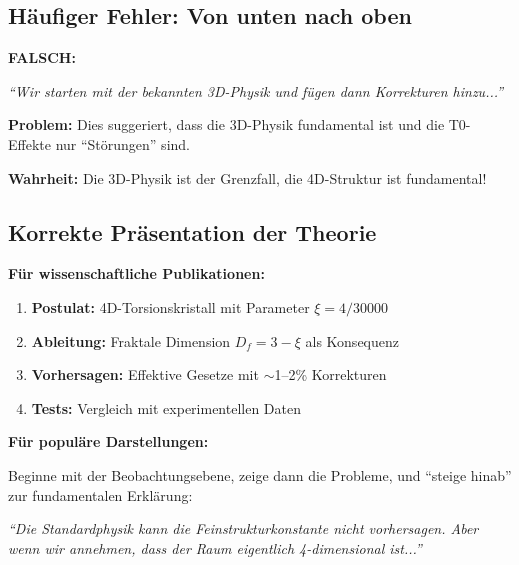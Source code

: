 	\subsection{Häufiger Fehler: Von unten nach oben}
	
	\begin{warning}
		\textbf{FALSCH:}
		
		\textit{\enquote{Wir starten mit der bekannten 3D-Physik und fügen dann Korrekturen hinzu...}}
		
		\vspace{0.3cm}
		
		\textbf{Problem:} Dies suggeriert, dass die 3D-Physik fundamental ist und die T0-Effekte nur \enquote{Störungen} sind.
		
		\vspace{0.3cm}
		
		\textbf{Wahrheit:} Die 3D-Physik ist der Grenzfall, die 4D-Struktur ist fundamental!
	\end{warning}
	
	\subsection{Korrekte Präsentation der Theorie}
	
	\begin{important}
		\textbf{Für wissenschaftliche Publikationen:}
		
		\begin{enumerate}
			\item \textbf{Postulat:} 4D-Torsionskristall mit Parameter $\xi = 4/30000$
			\item \textbf{Ableitung:} Fraktale Dimension $D_f = 3-\xi$ als Konsequenz
			\item \textbf{Vorhersagen:} Effektive Gesetze mit $\sim$1--2\% Korrekturen
			\item \textbf{Tests:} Vergleich mit experimentellen Daten
		\end{enumerate}
		
		\vspace{0.3cm}
		
		\textbf{Für populäre Darstellungen:}
		
		Beginne mit der Beobachtungsebene, zeige dann die Probleme, und \enquote{steige hinab} zur fundamentalen Erklärung:
		
		\textit{\enquote{Die Standardphysik kann die Feinstrukturkonstante nicht vorhersagen. Aber wenn wir annehmen, dass der Raum eigentlich 4-dimensional ist...}}
	\end{important}
	
